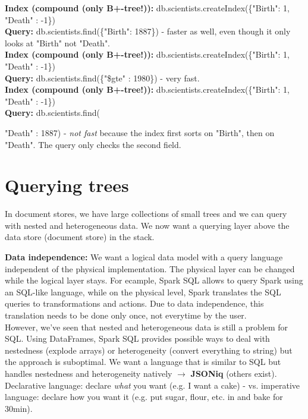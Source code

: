 \documentclass[11pt,oneside,a4paper]{article}
\begin{document}
\textbf{Index (compound (only B+-tree!)):} db.scientists.createIndex(\{"Birth": 1, "Death" : -1\})\\
\textbf{Query:} db.scientists.find(\{"Birth": 1887\}) - faster as well, even though it only looks at "Birth" not "Death".\\

\textbf{Index (compound (only B+-tree!)):} db.scientists.createIndex(\{"Birth": 1, "Death" : -1\})\\
\textbf{Query:} db.scientists.find(\{"\$gte" : 1980\}) - very fast.\\

\textbf{Index (compound (only B+-tree!)):} db.scientists.createIndex(\{"Birth": 1, "Death" : -1\})\\
\textbf{Query:} db.scientists.find({"Death" : 1887) - \textit{not fast} because the index first sorts on "Birth", then on "Death". The query only checks the second field.\\


\section{Querying trees}

In document stores, we have large collections of small trees and we can query with nested and heterogeneous data. We now want a querying layer above the data store (document store) in the stack.

\textbf{Data independence:} We want a logical data model with a query language independent of the physical implementation. The physical layer can be changed while the logical layer stays. For ecample, Spark SQL allows to query Spark using an SQL-like language, while on the physical level, Spark translates the SQL queries to transformations and actions. Due to data independence, this translation needs to be done only once, not everytime by the user.\\

However, we've seen that nested and heterogeneous data is still a problem for SQL. Using DataFrames, Spark SQL provides possible ways to deal with nestedness (explode arrays) or heterogeneity (convert everything to string) but the approach is suboptimal. We want a language that is similar to SQL but handles nestedness and heterogeneity natively $\rightarrow$ \textbf{JSONiq} (others exist).\\

Declarative language: declare \textit{what} you want (e.g. I want a cake) - vs. imperative language: declare how you want it (e.g. put sugar, flour, etc. in and bake for 30min).

}
\end{document}
